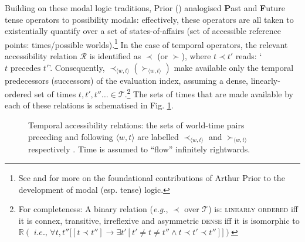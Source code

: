 \documentclass[12pt,dvipsnames]{report}
\begin{document}
\noindent Building on these modal logic traditions, Prior (\citeyear{Prior1958,Prior1967,Prior1957}) analogised \textbf{P}ast and \textbf{F}uture tense operators to possibility modals: effectively, these operators are all taken to existentially quantify over a set of states-of-affairs (set of accessible reference points: times/possible worlds).\footnote{See \citet{Copeland2002,Copeland2020} and \citet{Markoska-Cubrinovska2016} for more on the foundational contributions of Arthur Prior to the development of modal (esp. tense) logic.} In the case of temporal operators, the relevant accessibility relation $ \mathcal R $ is identified as $ \prec $ (or $ \succ $), where $ t\prec t' $ reads: `$ t \text{ precedes }t' $'. Consequently, $ \prec_{\langle w,t\rangle} (\succ_{\langle w,t\rangle}) $ make available only the temporal predecessors (successors) of the evaluation index, assuming a dense, linearly-ordered set of times $ t,t',t''\hdots\in\mathcal T $.\footnote{For completeness:
\pex[exno=,exnoformat=X] A binary relation (\textit{e.g.}, $ \prec $ over $ \mathcal T $) is:
\a  \textsc{linearly ordered} iff it is connex, transitive, irreflexive and asymmetric
\a \textsc{dense} iff it is isomorphic to $ \mathbb R (\textit{ i.e., } \forall t,t''\big[[t\prec t'']\to\exists t'[t'\neq t\neq t''\wedge t\prec t'\prec t'']\big] )$
\xe	
	
} 
The sets of times that are made available by each of these relations is schematised in Fig. \ref{temp-access}. 




\begin{figure}[h]\centering
	\caption[Temporal accessibility relations]{Temporal accessibility relations: the sets of world-time pairs preceding and following $ \langle w,t\rangle $  are labelled $ \prec_{\langle w,t\rangle} $ and  $ \succ_{\langle w,t\rangle} $ respectively \citep*[adapted from][93]{Kaufmann2006}. Time is assumed to ``flow'' infinitely rightwards.}\label{temp-access}
\end{figure}
\end{document}
